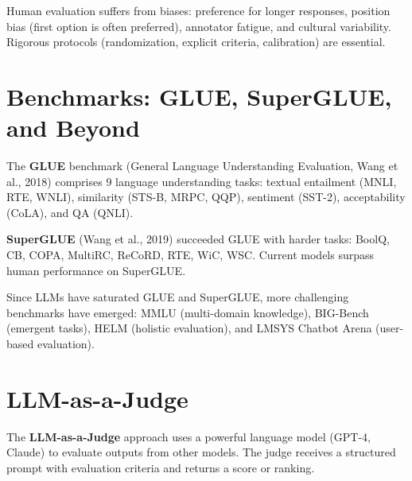 \begin{warning}[title=\textbf{Human Evaluation Biases}]
Human evaluation suffers from biases: preference for longer responses,
position bias (first option is often preferred), annotator fatigue, and
cultural variability. Rigorous protocols (randomization, explicit
criteria, calibration) are essential.
\end{warning}

\section{Benchmarks: GLUE, SuperGLUE, and Beyond}
\label{sec:eval:benchmarks}

\begin{definition}[GLUE]
The \textbf{GLUE} benchmark (General Language Understanding Evaluation,
Wang et al., 2018) comprises 9 language understanding tasks: textual
entailment (MNLI, RTE, WNLI), similarity (STS-B, MRPC, QQP), sentiment
(SST-2), acceptability (CoLA), and QA (QNLI).
\end{definition}

\begin{definition}[SuperGLUE]
\textbf{SuperGLUE} (Wang et al., 2019) succeeded GLUE with harder tasks:
BoolQ, CB, COPA, MultiRC, ReCoRD, RTE, WiC, WSC. Current models surpass
human performance on SuperGLUE.
\end{definition}

\begin{remark}
Since LLMs have saturated GLUE and SuperGLUE, more challenging
benchmarks have emerged: MMLU (multi-domain knowledge), BIG-Bench
(emergent tasks), HELM (holistic evaluation), and LMSYS Chatbot Arena
(user-based evaluation).
\end{remark}

\section{LLM-as-a-Judge}
\label{sec:eval:llm_judge}

\begin{definition}
The \textbf{LLM-as-a-Judge} approach uses a powerful language model
(GPT-4, Claude) to evaluate outputs from other models. The judge
receives a structured prompt with evaluation criteria and returns a
score or ranking.
\end{definition}

